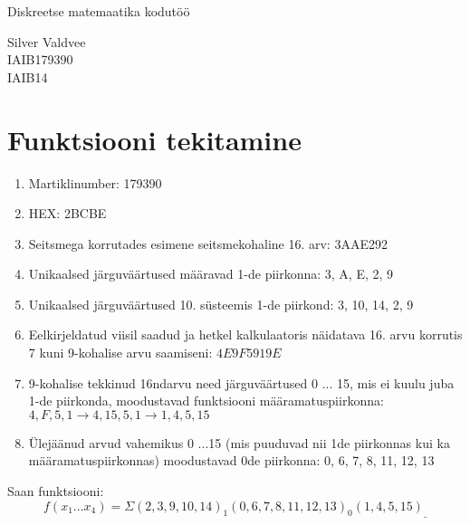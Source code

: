 \documentclass{article}
\begin{document}
\begin{titlepage}
\centering
\vspace*{\fill}
\Huge{Diskreetse matemaatika kodutöö}
\begin{flushright}
\large{
Silver Valdvee\\
IAIB179390\\
IAIB14}
\end{flushright}
\vspace*{\fill}
\thispagestyle{firstpage}
\end{titlepage}
\section{Funktsiooni tekitamine}
\begin{enumerate}
    \item Martiklinumber: 179390
    \item HEX: 2BCBE
    \item Seitsmega korrutades esimene seitsmekohaline 16. arv: 3AAE292
    \item Unikaalsed järguväärtused määravad 1-de piirkonna: 3, A, E, 2, 9
    \item Unikaalsed järguväärtused 10. süsteemis 1-de piirkond: 3, 10, 14, 2, 9
    \item Eelkirjeldatud viisil saadud ja hetkel kalkulaatoris näidatava 16. arvu korrutis 7 kuni 9-kohalise arvu saamiseni: $4E9F5919E$
    \item 9-kohalise tekkinud 16ndarvu need järguväärtused 0 ... 15, mis ei kuulu juba 1-de piirkonda, moodustavad funktsiooni määramatuspiirkonna: $4, F, 5, 1 \rightarrow 4, 15, 5, 1 \rightarrow 1, 4, 5, 15$
    \item Ülejäänud arvud vahemikus 0 ...15 (mis puuduvad nii 1de piirkonnas kui ka määramatuspiirkonnas) moodustavad 0de piirkonna: 0, 6, 7, 8, 11, 12, 13
\end{enumerate}
Saan funktsiooni:
\[f(x_1...x_4)=\Sigma(2,3,9,10,14)_1(0,6,7,8,11,12,13)_0(1,4,5,15)_{\_}
\]
\end{document}
